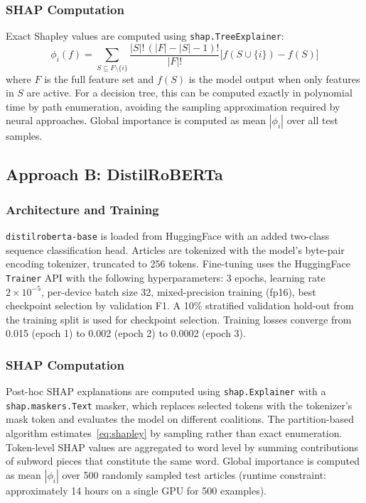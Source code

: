 \documentclass[journal,10pt,twocolumn]{IEEEtran}
\begin{document}
\subsubsection{SHAP Computation}
Exact Shapley values are computed using \texttt{shap.TreeExplainer}:
\begin{equation}
  \phi_i(f) = \sum_{S \subseteq F \setminus \{i\}}
    \frac{|S|!\,(|F|-|S|-1)!}{|F|!}
    \bigl[f(S \cup \{i\}) - f(S)\bigr]
  \label{eq:shapley}
\end{equation}
where $F$ is the full feature set and $f(S)$ is the model output when
only features in $S$ are active.  For a decision tree, this can be
computed exactly in polynomial time by path enumeration, avoiding the
sampling approximation required by neural approaches.  Global importance
is computed as mean $|\phi_i|$ over all test samples.

\subsection{Approach B: DistilRoBERTa}
\label{sec:approach_b}

\subsubsection{Architecture and Training}
\texttt{distilroberta-base} is loaded from HuggingFace with an added
two-class sequence classification head.  Articles are tokenized with
the model's byte-pair encoding tokenizer, truncated to 256 tokens.
Fine-tuning uses the HuggingFace \texttt{Trainer} API with the
following hyperparameters: 3 epochs, learning rate $2 \times 10^{-5}$,
per-device batch size 32, mixed-precision training (fp16), best
checkpoint selection by validation F1.  A 10\% stratified validation
hold-out from the training split is used for checkpoint selection.
Training losses converge from 0.015 (epoch 1) to 0.002 (epoch 2) to
0.0002 (epoch 3).

\subsubsection{SHAP Computation}
Post-hoc SHAP explanations are computed using \texttt{shap.Explainer}
with a \texttt{shap.maskers.Text} masker, which replaces selected tokens
with the tokenizer's mask token and evaluates the model on different
coalitions.  The partition-based algorithm estimates~\eqref{eq:shapley}
by sampling rather than exact enumeration.  Token-level SHAP values are
aggregated to word level by summing contributions of subword pieces that
constitute the same word.  Global importance is computed as mean
$|\phi_i|$ over 500 randomly sampled test articles (runtime constraint:
approximately 14 hours on a single GPU for 500 examples).
\end{document}
